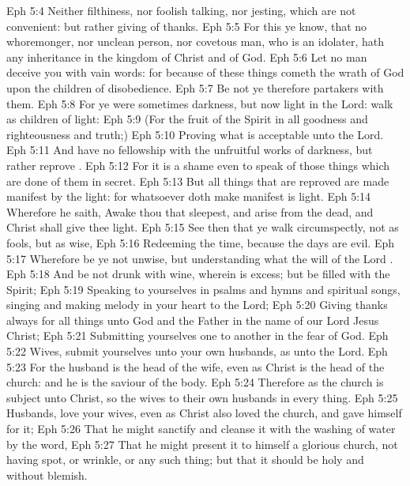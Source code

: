 \vs Eph 5:4 Neither filthiness, nor foolish talking, nor jesting, which are not convenient: but rather giving of thanks.
\vs Eph 5:5 For this ye know, that no whoremonger, nor unclean person, nor covetous man, who is an idolater, hath any inheritance in the kingdom of Christ and of God.
\vs Eph 5:6 Let no man deceive you with vain words: for because of these things cometh the wrath of God upon the children of disobedience.
\vs Eph 5:7 Be not ye therefore partakers with them.
\vs Eph 5:8 For ye were sometimes darkness, but now  light in the Lord: walk as children of light:
\vs Eph 5:9 (For the fruit of the Spirit  in all goodness and righteousness and truth;)
\vs Eph 5:10 Proving what is acceptable unto the Lord.
\vs Eph 5:11 And have no fellowship with the unfruitful works of darkness, but rather reprove .
\vs Eph 5:12 For it is a shame even to speak of those things which are done of them in secret.
\vs Eph 5:13 But all things that are reproved are made manifest by the light: for whatsoever doth make manifest is light.
\vs Eph 5:14 Wherefore he saith, Awake thou that sleepest, and arise from the dead, and Christ shall give thee light.
\vs Eph 5:15 See then that ye walk circumspectly, not as fools, but as wise,
\vs Eph 5:16 Redeeming the time, because the days are evil.
\vs Eph 5:17 Wherefore be ye not unwise, but understanding what the will of the Lord .
\vs Eph 5:18 And be not drunk with wine, wherein is excess; but be filled with the Spirit;
\vs Eph 5:19 Speaking to yourselves in psalms and hymns and spiritual songs, singing and making melody in your heart to the Lord;
\vs Eph 5:20 Giving thanks always for all things unto God and the Father in the name of our Lord Jesus Christ;
\vs Eph 5:21 Submitting yourselves one to another in the fear of God.
\vs Eph 5:22 Wives, submit yourselves unto your own husbands, as unto the Lord.
\vs Eph 5:23 For the husband is the head of the wife, even as Christ is the head of the church: and he is the saviour of the body.
\vs Eph 5:24 Therefore as the church is subject unto Christ, so  the wives  to their own husbands in every thing.
\vs Eph 5:25 Husbands, love your wives, even as Christ also loved the church, and gave himself for it;
\vs Eph 5:26 That he might sanctify and cleanse it with the washing of water by the word,
\vs Eph 5:27 That he might present it to himself a glorious church, not having spot, or wrinkle, or any such thing; but that it should be holy and without blemish.
